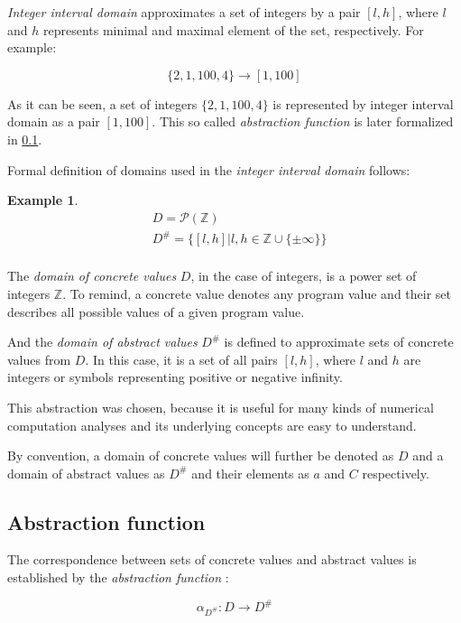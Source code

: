 \documentclass[12pt,oneside]{fithesis2}
\theoremstyle{definition}
\newtheorem{exmp}{Example}[section]
\begin{document}
\textit{Integer interval domain} approximates a set of integers by a pair $[l, h]$, where $l$ and $h$ represents minimal and maximal element of the set, respectively. For example:

\[
  \{ 2, 1, 100, 4 \} \to [1, 100]
\]

As it can be seen, a set of integers $\{2, 1, 100, 4\}$ is represented by integer interval domain as a pair $[1, 100]$. This so called \textit{abstraction function} is later formalized in \ref{ssec:abstraction-function}.

Formal definition of domains used in the \textit{integer interval domain} follows:

\begin{exmp}
  \begin{align*}
    &D = \mathcal P(\mathbb Z)\\
    &D^\# = \{[l,h] | l,h \in \mathbb{Z} \cup \{\pm\infty\}\}\\
  \end{align*}
\end{exmp}

The \textit{domain of concrete values} $D$, in the case of integers, is a power set of integers $\mathbb Z$. To remind, a concrete value denotes any program value and their set describes all possible values of a given program value.

And the \textit{domain of abstract values} $D^\#$ is defined to approximate sets of concrete values from $D$. In this case, it is a set of all pairs $[l, h]$, where $l$ and $h$ are integers or symbols representing positive or negative infinity.

This abstraction was chosen, because it is useful for many kinds of numerical computation analyses\cite{mine-AIAA10} and its underlying concepts are easy to understand.

By convention, a domain of concrete values will further be denoted as $D$ and a domain of abstract values as $D^\#$ and their elements as $a$ and $C$ respectively.

\subsection{Abstraction function}\label{ssec:abstraction-function}

The correspondence between sets of concrete values and abstract values is established by the \textit{abstraction function} \cite{CousotCousot76-1}:

\[
\alpha_{D^\#}\colon D \to D^\#
\]
\end{document}
